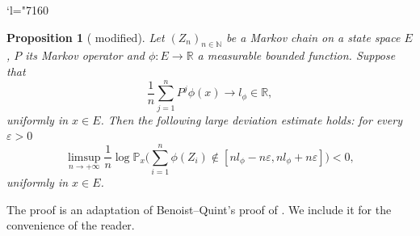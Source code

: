 \documentclass[10pt]{amsart}
\newcommand{\Changel}{\mathcode`l="7160}
\let\epsilon\varepsilon
\let\ts\textstyle
\theoremstyle{plain}
\newtheorem{proposition}[theorem]{Proposition}
\theoremstyle{definition}
\newcommand\R{\mathbb{R}}
\newcommand\p{\mathbb{P}}
\newcommand\N{\mathbb{N}}
\begin{document}
\Changel
\begin{proposition}[{\cite[Prop.\,3.1]{BQ.CLT} modified}]\label{proposition.deviations.MC}
Let $(Z_n)_{n\in \N}$ be a Markov chain on a state space $E$, $P$ its Markov operator and $\phi: E\to \R$ a measurable bounded function. Suppose that\vspace*{-3pt}
\begin{equation}\label{uniform}\frac{1}{n}\sum_{j=1}^n{P^j\phi(x)}\to l_{\phi}\in \R,\end{equation} uniformly in $x\in E$. Then the following large deviation estimate holds: for every $\epsilon>0$
\[
\limsup_{n\to +\infty}\frac{1}{n}\log \p_x \bigl(\ts
\sum_{i=1}^n\phi(Z_i) \not\in [nl_{\phi} - n\epsilon , nl_{\phi} +n\epsilon] \bigr)<0,
\]
uniformly in $x\in E$.
\end{proposition}
The proof is an adaptation of Benoist--Quint's proof of \cite[Prop.\,3.1]{BQ.CLT}. We include it for the convenience of the reader.
\end{document}
